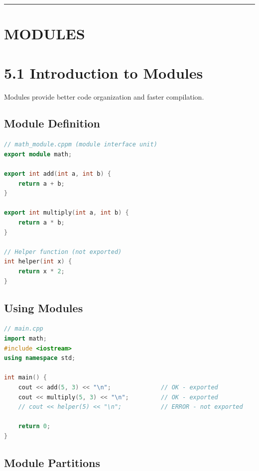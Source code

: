 \begin{center}\rule{0.5\linewidth}{0.5pt}\end{center}

\hypertarget{modules}{%
\section{MODULES}\label{modules}}

\hypertarget{introduction-to-modules}{%
\section{5.1 Introduction to Modules}\label{introduction-to-modules}}

Modules provide better code organization and faster compilation.

\hypertarget{module-definition}{%
\subsection{Module Definition}\label{module-definition}}

\begin{lstlisting}[language={C++}]
// math_module.cppm (module interface unit)
export module math;

export int add(int a, int b) {
    return a + b;
}

export int multiply(int a, int b) {
    return a * b;
}

// Helper function (not exported)
int helper(int x) {
    return x * 2;
}
\end{lstlisting}

\hypertarget{using-modules}{%
\subsection{Using Modules}\label{using-modules}}

\begin{lstlisting}[language={C++}]
// main.cpp
import math;
#include <iostream>
using namespace std;

int main() {
    cout << add(5, 3) << "\n";              // OK - exported
    cout << multiply(5, 3) << "\n";         // OK - exported
    // cout << helper(5) << "\n";           // ERROR - not exported
    
    return 0;
}
\end{lstlisting}

\hypertarget{module-partitions}{%
\subsection{Module Partitions}\label{module-partitions}}

